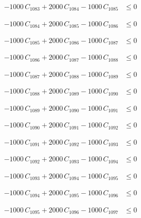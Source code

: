 \documentclass[a4paper,11pt]{article}
\begin{document}
\begin{align}
-1000\,C_{1083} + 2000\,C_{1084} - 1000\,C_{1085} &\leq 0 \nonumber
\end{align}

\begin{align}
-1000\,C_{1084} + 2000\,C_{1085} - 1000\,C_{1086} &\leq 0 \nonumber
\end{align}

\begin{align}
-1000\,C_{1085} + 2000\,C_{1086} - 1000\,C_{1087} &\leq 0 \nonumber
\end{align}

\begin{align}
-1000\,C_{1086} + 2000\,C_{1087} - 1000\,C_{1088} &\leq 0 \nonumber
\end{align}

\begin{align}
-1000\,C_{1087} + 2000\,C_{1088} - 1000\,C_{1089} &\leq 0 \nonumber
\end{align}

\begin{align}
-1000\,C_{1088} + 2000\,C_{1089} - 1000\,C_{1090} &\leq 0 \nonumber
\end{align}

\begin{align}
-1000\,C_{1089} + 2000\,C_{1090} - 1000\,C_{1091} &\leq 0 \nonumber
\end{align}

\begin{align}
-1000\,C_{1090} + 2000\,C_{1091} - 1000\,C_{1092} &\leq 0 \nonumber
\end{align}

\begin{align}
-1000\,C_{1091} + 2000\,C_{1092} - 1000\,C_{1093} &\leq 0 \nonumber
\end{align}

\begin{align}
-1000\,C_{1092} + 2000\,C_{1093} - 1000\,C_{1094} &\leq 0 \nonumber
\end{align}

\begin{align}
-1000\,C_{1093} + 2000\,C_{1094} - 1000\,C_{1095} &\leq 0 \nonumber
\end{align}

\begin{align}
-1000\,C_{1094} + 2000\,C_{1095} - 1000\,C_{1096} &\leq 0 \nonumber
\end{align}

\begin{align}
-1000\,C_{1095} + 2000\,C_{1096} - 1000\,C_{1097} &\leq 0 \nonumber
\end{align}
\end{document}

